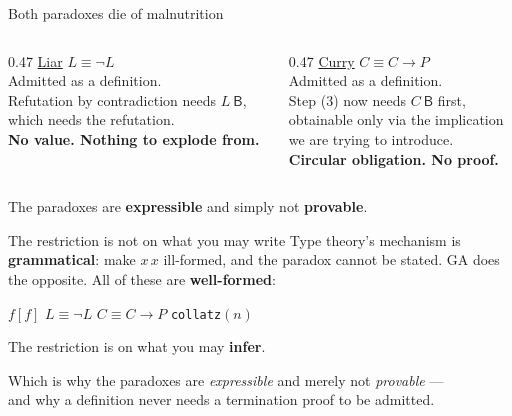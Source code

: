 \documentclass[aspectratio=169,11pt]{beamer}
\newcommand{\key}[1]{{\color{accent}\textbf{#1}}}
\begin{document}
\begin{frame}{Both paradoxes die of malnutrition}
  \begin{columns}[T]
    \begin{column}{0.47\textwidth}
      \underline{Liar} \quad $L \equiv \neg L$\\[0.8em]
      Admitted as a definition.\\[0.6em]
      Refutation by contradiction needs $L\ \mathsf{B}$,\\
      which needs the refutation.\\[0.8em]
      \key{No value. Nothing to explode from.}
    \end{column}
    \begin{column}{0.47\textwidth}
      \underline{Curry} \quad $C \equiv C \to P$\\[0.8em]
      Admitted as a definition.\\[0.6em]
      Step (3) now needs $C\ \mathsf{B}$ first,\\
      obtainable only via the implication\\
      we are trying to introduce.\\[0.8em]
      \key{Circular obligation. No proof.}
    \end{column}
  \end{columns}
  \vfill
  \begin{center}\small
    The paradoxes are \key{expressible} and simply not \key{provable}.
  \end{center}
\end{frame}

\begin{frame}{The restriction is not on what you may write}
  \vfill
  Type theory's mechanism is \key{grammatical}: make $x\,x$ ill-formed,
  and the paradox cannot be stated.
  \vfill
  \pause
  GA does the opposite. All of these are \key{well-formed}:
  \begin{center}\small
    $f[f]$ \qquad $L \equiv \neg L$ \qquad $C \equiv C \to P$
    \qquad \texttt{collatz}$(n)$
  \end{center}
  \vfill
  \pause
  \begin{center}\Large
    The restriction is on what you may \key{infer}.
  \end{center}
  \vfill
  \begin{center}\small
    Which is why the paradoxes are \emph{expressible} and merely not \emph{provable}
    ---\\ and why a definition never needs a termination proof to be admitted.
  \end{center}
  \vfill
\end{frame}
\end{document}
